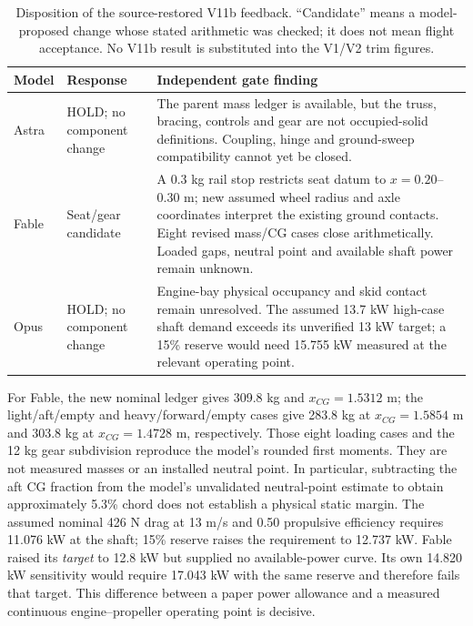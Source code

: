 \documentclass[10pt,letterpaper]{article}
\begin{document}
\begin{table}[H]\centering\small
\caption{Disposition of the source-restored V11b feedback. ``Candidate'' means a model-proposed change whose stated arithmetic was checked; it does not mean flight acceptance. No V11b result is substituted into the V1/V2 trim figures.}\label{tab:v11b}
\begin{tabularx}{\linewidth}{@{}p{16mm}p{31mm}X@{}}\toprule
Model & Response & Independent gate finding\\\midrule
Astra & HOLD; no component change & The parent mass ledger is available, but the truss, bracing, controls and gear are not occupied-solid definitions. Coupling, hinge and ground-sweep compatibility cannot yet be closed.\\
Fable & Seat/gear candidate & A 0.3 kg rail stop restricts seat datum to $x=0.20$--$0.30$ m; new assumed wheel radius and axle coordinates interpret the existing ground contacts. Eight revised mass/CG cases close arithmetically. Loaded gaps, neutral point and available shaft power remain unknown.\\
Opus & HOLD; no component change & Engine-bay physical occupancy and skid contact remain unresolved. The assumed 13.7 kW high-case shaft demand exceeds its unverified 13 kW target; a 15\% reserve would need 15.755 kW measured at the relevant operating point.\\\bottomrule
\end{tabularx}
\end{table}

For Fable, the new nominal ledger gives 309.8 kg and $x_{CG}=1.5312$ m; the light/aft/empty and heavy/forward/empty cases give 283.8 kg at $x_{CG}=1.5854$ m and 303.8 kg at $x_{CG}=1.4728$ m, respectively. Those eight loading cases and the 12 kg gear subdivision reproduce the model's rounded first moments. They are not measured masses or an installed neutral point. In particular, subtracting the aft CG fraction from the model's unvalidated neutral-point estimate to obtain approximately 5.3\% chord does not establish a physical static margin. The assumed nominal 426 N drag at 13 m/s and 0.50 propulsive efficiency requires 11.076 kW at the shaft; 15\% reserve raises the requirement to 12.737 kW. Fable raised its \emph{target} to 12.8 kW but supplied no available-power curve. Its own 14.820 kW sensitivity would require 17.043 kW with the same reserve and therefore fails that target. This difference between a paper power allowance and a measured continuous engine--propeller operating point is decisive.
\end{document}
